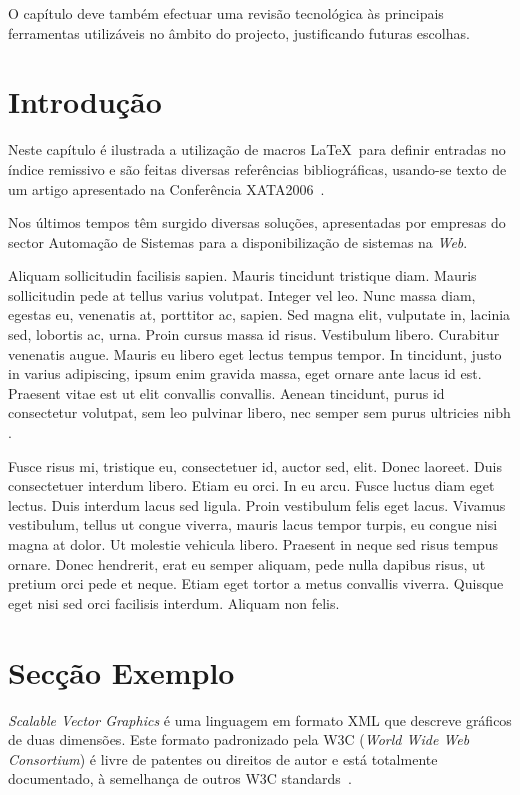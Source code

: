 O capítulo deve também efectuar uma revisão tecnológica às principais
ferramentas utilizáveis no âmbito do projecto, justificando futuras
escolhas.

\section{Introdução}

Neste capítulo é ilustrada a utilização de macros \LaTeX\ para definir
entradas no índice remissivo e são feitas diversas referências
bibliográficas, usando-se texto de um artigo apresentado na Conferência 
XATA2006~\citep{kn:MVL06-xata}.

Nos últimos tempos têm surgido diversas soluções, apresentadas por
empresas do sector Automação de Sistemas para a disponibilização de
sistemas \scadadms{} na \textit{Web}.

Aliquam sollicitudin facilisis sapien. Mauris tincidunt tristique
diam. Mauris sollicitudin pede at tellus varius volutpat. Integer vel
leo. Nunc massa diam, egestas eu, venenatis at, porttitor ac,
sapien. Sed magna elit, vulputate in, lacinia sed, lobortis ac,
urna. Proin cursus massa id risus. Vestibulum libero. Curabitur
venenatis augue. Mauris eu libero eget lectus tempus tempor. In
tincidunt, justo in varius adipiscing, ipsum enim gravida massa, eget
ornare ante lacus id est. Praesent vitae est ut elit convallis
convallis. Aenean tincidunt, purus id consectetur volutpat, sem leo
pulvinar libero, nec semper sem purus ultricies nibh \cite{kn:Fra94-thesis}. 

Fusce risus mi, tristique eu, consectetuer id, auctor sed, elit. Donec
laoreet. Duis consectetuer interdum libero. Etiam eu orci. In eu
arcu. Fusce luctus diam eget lectus. Duis interdum lacus sed
ligula. Proin vestibulum felis eget lacus. Vivamus vestibulum, tellus
ut congue viverra, mauris lacus tempor turpis, eu congue nisi magna at
dolor. Ut molestie vehicula libero. Praesent in neque sed risus tempus
ornare. Donec hendrerit, erat eu semper aliquam, pede nulla dapibus
risus, ut pretium orci pede et neque.
Etiam eget tortor a metus convallis viverra. Quisque eget nisi sed
orci facilisis interdum. Aliquam non felis. 

\section{Secção Exemplo}\label{sec:dialecto}

\emph{Scalable Vector Graphics} é uma
linguagem em formato XML que descreve gráficos de duas dimensões. 
Este formato padronizado pela W3C (\emph{World Wide Web Consortium})
é livre de patentes ou direitos de autor e está totalmente
documentado, à semelhança de outros W3C
standards~\citep{kn:svgdoc}.

